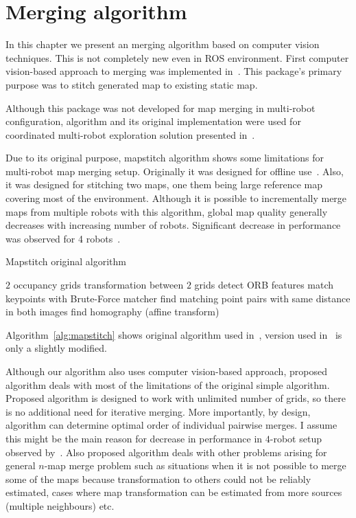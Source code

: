 \chapter{Merging algorithm}

In this chapter we present an merging algorithm based on computer vision techniques. This is not completely new even in \gls{ROS} environment. First computer vision-based approach to merging was implemented in~\cite{MapstitchROS}. This package's primary purpose was to stitch generated map to existing static map.

Although this package was not developed for map merging in multi-robot configuration, algorithm and its original implementation were used for coordinated multi-robot exploration solution presented in~\cite{Andre2014}.

Due to its original purpose, mapstitch algorithm shows some limitations for multi-robot map merging setup. Originally it was designed for offline use~\cite{Andre2014}. Also, it was designed for stitching two maps, one them being large reference map covering most of the environment. Although it is possible to incrementally merge maps from multiple robots with this algorithm, global map quality generally decreases with increasing number of robots. Significant decrease in performance was observed for 4 robots~\cite{Andre2014}.

\begin{algorithm}
    \caption{Mapstitch original algorithm}
    \label{alg:mapstitch}
    \begin{algorithmic}[1]
        \Require $2$ occupancy grids
        \Ensure transformation between $2$ grids
            \State detect \gls{ORB} features
            \State match keypoints with Brute-Force matcher
            \State find matching point pairs with same distance in both images
            \State find homography (affine transform)
        \EndProcedure
    \end{algorithmic}
\end{algorithm}

Algorithm~\ref{alg:mapstitch} shows original algorithm used in~\cite{MapstitchROS}, version used in~\cite{Andre2014} is only a slightly modified.

Although our algorithm also uses computer vision-based approach, proposed algorithm deals with most of the limitations of the original simple algorithm. Proposed algorithm is designed to work with unlimited number of grids, so there is no additional need for iterative merging. More importantly, by design, algorithm can determine optimal order of individual pairwise merges. I assume this might be the main reason for decrease in performance in $4$-robot setup observed by~\cite{Andre2014}. Also proposed algorithm deals with other problems arising for general $n$-map merge problem such as situations when it is not possible to merge some of the maps because transformation to others could not be reliably estimated, cases where map transformation can be estimated from more sources (multiple neighbours) etc.

